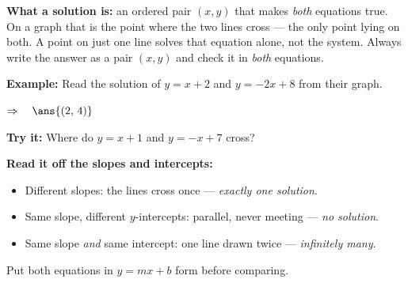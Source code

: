 \documentclass[12pt]{article}
\begin{document}


\begin{formulabox}
\textbf{What a solution is:} an ordered pair $(x, y)$ that makes \emph{both} equations true. On a
graph that is the point where the two lines cross --- the only point lying on both. A point on just
one line solves that equation alone, not the system. Always write the answer as a pair
$(x, y)$ and check it in \emph{both} equations.
\end{formulabox}

\begin{examplebox}
\textbf{Example:} \quad Read the solution of $y = x + 2$ and $y = -2x + 8$ from their graph.

$\Rightarrow\quad \ans{(2,\,4)}$
\end{examplebox}

\begin{tryitbox}
\textbf{Try it:} \quad Where do $y = x + 1$ and $y = -x + 7$ cross?\\[2pt]
\end{tryitbox}


\begin{formulabox}
\textbf{Read it off the slopes and intercepts:}
\begin{itemize}[leftmargin=0.75cm, itemsep=1pt, topsep=2pt]
  \item Different slopes: the lines cross once --- \emph{exactly one solution}.
  \item Same slope, different $y$-intercepts: parallel, never meeting --- \emph{no solution}.
  \item Same slope \emph{and} same intercept: one line drawn twice --- \emph{infinitely many}.
\end{itemize}
Put both equations in $y = mx + b$ form before comparing.
\end{formulabox}
\end{document}
